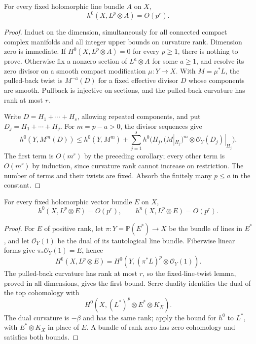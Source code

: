 \begin{lemma}\label{lem:curvature-rank-fixed-line-twist}
For every fixed holomorphic line bundle $A$ on $X$,
\[
 h^0(X,L^p\otimes A)=O(p^r).
\]
\end{lemma}
\begin{proof}
Induct on the dimension, simultaneously for all connected compact complex manifolds and all integer upper bounds on curvature rank. Dimension zero is immediate. If $H^0(X,L^p\otimes A)=0$ for every $p\geq1$, there is nothing to prove. Otherwise fix a nonzero section of $L^a\otimes A$ for some $a\geq1$, and resolve its zero divisor on a smooth compact modification $\mu\colon Y\to X$. With $M=\mu^*L$, the pulled-back twist is $M^{-a}(D)$ for a fixed effective divisor $D$ whose components are smooth. Pullback is injective on sections, and the pulled-back curvature has rank at most $r$.

Write $D=H_1+\cdots+H_s$, allowing repeated components, and put $D_j=H_1+\cdots+H_j$. For $m=p-a>0$, the divisor sequences give
\[
 h^0(Y,M^m(D))
 \leq h^0(Y,M^m)+\sum_{j=1}^s
       h^0\bigl(H_j,(M|_{H_j})^m\otimes\mathcal O_Y(D_j)|_{H_j}\bigr).
\]
The first term is $O(m^r)$ by the preceding corollary; every other term is $O(m^r)$ by induction, since curvature rank cannot increase on restriction. The number of terms and their twists are fixed. Absorb the finitely many $p\leq a$ in the constant.
\end{proof}

\begin{corollary}\label{cor:curvature-rank-endpoint-cohomology}
For every fixed holomorphic vector bundle $E$ on $X$,
\[
 h^0(X,L^p\otimes E)=O(p^r),
 \qquad h^n(X,L^p\otimes E)=O(p^r).
\]
\end{corollary}
\begin{proof}
For $E$ of positive rank, let $\pi\colon Y=\mathbb P(E^*)\to X$ be the bundle of lines in $E^*$, and let $\mathcal O_Y(1)$ be the dual of its tautological line bundle. Fiberwise linear forms give $\pi_*\mathcal O_Y(1)=E$, hence
\[
 H^0(X,L^p\otimes E)
 =H^0(Y,(\pi^*L)^p\otimes\mathcal O_Y(1)).
\]
The pulled-back curvature has rank at most $r$, so the fixed-line-twist lemma, proved in all dimensions, gives the first bound. Serre duality identifies the dual of the top cohomology with
\[
 H^0(X,(L^*)^p\otimes E^*\otimes K_X).
\]
The dual curvature is $-\beta$ and has the same rank; apply the bound for $h^0$ to $L^*$, with $E^*\otimes K_X$ in place of $E$. A bundle of rank zero has zero cohomology and satisfies both bounds.
\end{proof}

